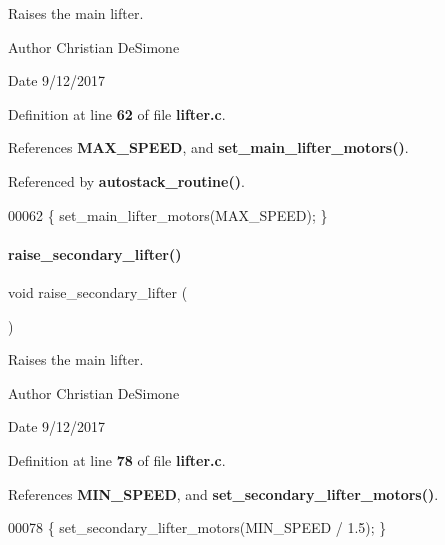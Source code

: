 Raises the main lifter. 

\begin{DoxyAuthor}{Author}
Christian De\+Simone 
\end{DoxyAuthor}
\begin{DoxyDate}{Date}
9/12/2017 
\end{DoxyDate}


Definition at line \textbf{ 62} of file \textbf{ lifter.\+c}.



References \textbf{ M\+A\+X\+\_\+\+S\+P\+E\+ED}, and \textbf{ set\+\_\+main\+\_\+lifter\+\_\+motors()}.



Referenced by \textbf{ autostack\+\_\+routine()}.


\begin{DoxyCode}
00062 \{ set_main_lifter_motors(MAX_SPEED); \}
\end{DoxyCode}
\mbox{\label{a00026_a786f679ea48bb8c80e00fbac9a69911b}} 
\paragraph{raise\+\_\+secondary\+\_\+lifter()}
{\footnotesize\ttfamily void raise\+\_\+secondary\+\_\+lifter (\begin{DoxyParamCaption}{ }\end{DoxyParamCaption})}



Raises the main lifter. 

\begin{DoxyAuthor}{Author}
Christian De\+Simone 
\end{DoxyAuthor}
\begin{DoxyDate}{Date}
9/12/2017 
\end{DoxyDate}


Definition at line \textbf{ 78} of file \textbf{ lifter.\+c}.



References \textbf{ M\+I\+N\+\_\+\+S\+P\+E\+ED}, and \textbf{ set\+\_\+secondary\+\_\+lifter\+\_\+motors()}.


\begin{DoxyCode}
00078 \{ set_secondary_lifter_motors(MIN_SPEED / 1.5); \}
\end{DoxyCode}
\mbox{\label{a00026_abddc7cb502e12fa277b627c90a45efb1}} 
